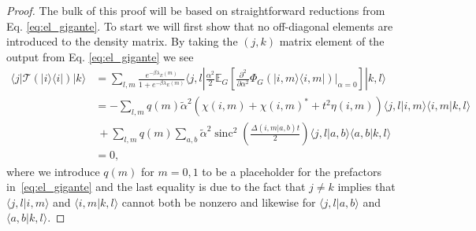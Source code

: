 \documentclass{article}
\newcommand{\ket}[1]{|#1\rangle}
\newcommand{\bra}[1]{\langle #1|}
\newcommand{\braket}[2]{\langle #1|#2\rangle}
\newcommand{\ketbra}[2]{| #1\rangle\! \langle #2|}
\DeclareMathOperator{\sinc}{sinc}
\begin{document}
\begin{proof}
    The bulk of this proof will be based on straightforward reductions from Eq. \eqref{eq:el_gigante}. To start we will first show that no off-diagonal elements are introduced to the density matrix. By taking the $(j,k)$ matrix element of the output from Eq. \eqref{eq:el_gigante} we see
    \begin{align}
        \bra{j} \mathcal{T}(\ketbra{i}{i})\ket{k} &= \sum_{l, m} \frac{e^{-\beta \lambda_E(m)}}{1 + e^{-\beta \lambda_E(m)}} \bra{j, l} \frac{\alpha^2}{2} \mathbb{E}_{G} \left[ \frac{\partial^2}{\partial \alpha^2} \Phi_G(\ketbra{i, m}{i, m}) \big|_{\alpha = 0} \right] \ket{k, l} \\
        &= - \sum_{l,m} q(m) \widetilde{\alpha}^2 (\chi(i,m) + \chi(i,m)^* + t^2 \eta(i,m)) \braket{j, l}{i, m} \braket{i, m}{k, l} \nonumber \\
        &~ + \sum_{l, m} q(m) \sum_{a,b} \widetilde{\alpha}^2 \sinc^2 \left(\frac{\Delta(i,m|a,b)t }{2} \right) \braket{j, l}{a,b} \braket{a, b}{k, l} \\
        &= 0,
    \end{align}
    where we introduce $q(m)$ for $m=0,1$ to be a placeholder for the prefactors in~\eqref{eq:el_gigante} and the last equality is due to the fact that $j \neq k$ implies that $\braket{j, l}{i,m}$ and $\braket{i,m}{k, l}$ cannot both be nonzero and likewise for $\braket{j, l}{a,b}$ and $\braket{a,b}{k,l}$.
    

\end{proof}
\end{document}
